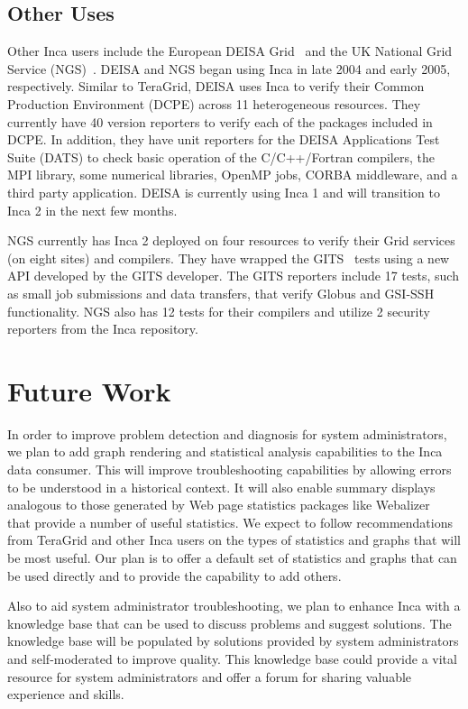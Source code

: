 \documentclass{sig-alternate}
\begin{document}
\subsection{Other Uses}

Other Inca users include the European DEISA Grid~\cite{deisa} and the UK National Grid
Service (NGS)~\cite{ngs}.  DEISA and NGS began using Inca in late 2004 and early 2005, respectively.  
Similar to TeraGrid, DEISA uses Inca to verify their Common
Production Environment (DCPE) across 11 heterogeneous resources.  They
currently have 40 version reporters to verify each of the packages included in
DCPE.  In addition, they have unit reporters for the DEISA Applications Test
Suite (DATS) to check basic operation of the C/C++/Fortran compilers, the MPI
library, some numerical libraries, OpenMP jobs, CORBA middleware, and a third
party application.  DEISA is currently using Inca 1 and will transition to
Inca 2 in the next few months.

NGS currently has Inca 2 deployed on four resources to verify their Grid services (on eight sites) and compilers.  They have wrapped the GITS~\cite{gits} tests using a new
API developed by the GITS developer.  The GITS reporters include 17 tests, 
such as small job submissions and data transfers, that verify Globus and GSI-SSH functionality.
NGS also has 12 tests for their compilers and
utilize 2 security reporters from the Inca repository.

\section{Future Work}

In order to improve problem detection and diagnosis for system administrators,
we plan to add graph rendering and statistical
analysis capabilities to the Inca data consumer.  This will improve troubleshooting capabilities by
allowing errors to be understood in a historical context.  It will also enable
summary displays analogous to those generated by Web page statistics packages
like Webalizer~\cite{webalizer} that provide a number of useful
statistics.  We expect to follow recommendations from TeraGrid and other Inca
users on the types of statistics and graphs that will be most useful.
Our plan is to offer a default set of statistics and graphs that can be used
directly and to provide the capability to add others.

Also to aid system administrator troubleshooting,
we plan to enhance Inca with a knowledge base that can be used to
discuss problems and suggest solutions.
The knowledge base will be populated by solutions provided by
system administrators and self-moderated to
improve quality.
This knowledge base could provide a vital resource
for system administrators and offer a forum for sharing
valuable experience and skills.   
\end{document}
